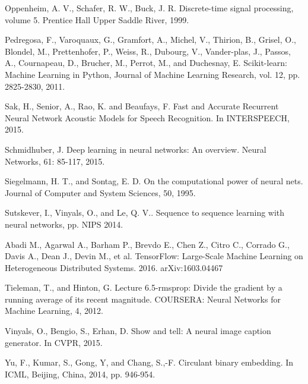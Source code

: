 \documentclass[a4paper,11pt]{article}
\begin{document}
\begin{thebibliography}{1}


 Oppenheim,  A.  V.,  Schafer, R. W.,  Buck,  J. R. Discrete-time signal processing, volume 5.  Prentice Hall Upper Saddle River, 1999.

 Pedregosa, F., Varoquaux, G.,  Gramfort, A.,  Michel, V., Thirion, B., Grisel, O., Blondel, M., Prettenhofer, P.,  Weiss, R., Dubourg, V.,  Vander-plas, J., Passos, A., Cournapeau, D., Brucher, M., Perrot, M., and Duchesnay, E. Scikit-learn: Machine Learning in Python, Journal of Machine Learning Research, vol. 12, pp. 2825-2830, 2011.


 Sak, H., Senior, A., Rao, K. and Beaufays, F. Fast and Accurate Recurrent Neural Network Acoustic Models for Speech Recognition. In INTERSPEECH, 2015.

  Schmidhuber, J. Deep  learning  in  neural  networks:  An  overview. Neural  Networks,  61: 85-117, 2015.


 Siegelmann, H. T., and Sontag, E. D.  On
the  computational  power  of  neural  nets.
Journal of Computer and System Sciences, 50, 1995.




 Sutskever, I., Vinyals, O., and Le, Q. V.. Sequence to sequence learning with neural networks, pp. NIPS 2014.


  Abadi M., Agarwal A., Barham P., Brevdo E., Chen Z., Citro C., Corrado G., Davis A., Dean J., Devin M., et al. TensorFlow: Large-Scale Machine Learning on Heterogeneous Distributed Systems. 2016. arXiv:1603.04467



 Tieleman, T., and Hinton, G.   Lecture 6.5-rmsprop:  Divide the gradient by a running average of its recent magnitude. COURSERA: Neural Networks for Machine Learning, 4, 2012.


 Vinyals, O., Bengio, S., Erhan, D. Show and tell: A neural image caption generator. In CVPR, 2015.




 Yu, F.,  Kumar, S., Gong, Y, and Chang, S.,-F.  Circulant binary embedding. In ICML, Beijing, China, 2014, pp. 946-954.


\end{thebibliography}
\end{document}
